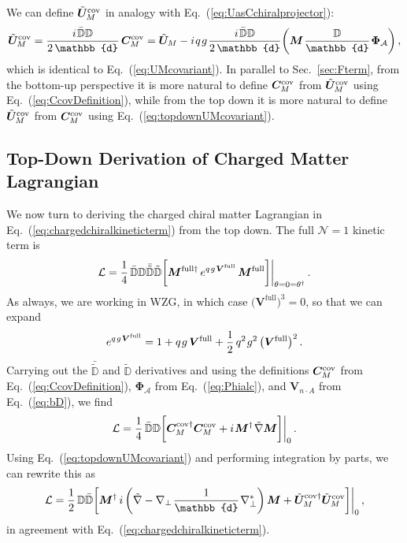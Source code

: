 \documentclass[12pt,document,nofootinbib,superscriptaddress,onecolumn,preprintnumbers,balancelastpage]{article}
\newcommand{\full}{\text{full}}
\newcommand{\s}{\hspace{0.8pt}}
\newcommand{\PP}{\mathbb{d}}
\DeclareRobustCommand{\Sec}[1]{Sec.~\ref{#1}}
\DeclareRobustCommand{\Eq}[1]{Eq.~(\ref{#1})}
\newcommand{\bM}{ \boldsymbol M}
\newcommand{\bPhiA}{ \boldsymbol{\Phi}_\alc}
\newcommand{\bC}{ \boldsymbol C}
\newcommand{\bV}{ \boldsymbol V}
\newcommand{\bD}{ \boldsymbol{V}_{n \cdot A}}
\newcommand{\bU}{ \tilde{\boldsymbol U}}
\newcommand{\D}{\mathbb{D}}
\newcommand{\alc}{\mathcal{A}}
\begin{document}
\begin{spacing}{1.2}
We can define $\bU_M^{\rm cov}$ in analogy with \Eq{eq:UasCchiralprojector}:
%
\begin{equation}
\label{eq:topdownUMcovariant}
\bU^{\rm cov}_M = \frac{i\s \bar{\D} \D}{2\,\PP}\, \bC^{\rm cov}_M = \bU_M - i\s q\s g\s \frac{i\s \bar{\D} \D}{2\, \PP} \bigg(\bM \s\frac{\D}{\PP} \s \bPhiA \bigg)\,,
\end{equation}
%
which is identical to \Eq{eq:UMcovariant}.
%
In parallel to \Sec{sec:Fterm}, from the bottom-up perspective it is more natural to define $\bC^{\rm cov}_M$ from $\bU^{\rm cov}_M$ using \Eq{eq:CcovDefinition}, while from the top down it is more natural to define $\bU^{\rm cov}_M$ from $\bC^{\rm cov}_M$ using \Eq{eq:topdownUMcovariant}. 



\subsection{Top-Down Derivation of Charged Matter Lagrangian}
\label{subsec:topdownchargedkinetic}
%
We now turn to deriving the charged chiral matter Lagrangian in \Eq{eq:chargedchiralkineticterm} from the top down.
%
The full $\mathcal{N} = 1$ kinetic term is
\begin{equation}
\mathcal{L} = \frac{1}{4}\, \bar{\D} \D \bar{\tilde{\D}} \tilde{\D} \bigg[ \bM^{\full \dagger}\, e^{q\s g\s \bV^\full}\, \bM^\full \bigg] \bigg|_{\theta = 0 = \theta^\dagger}\,.
\end{equation}
%
As always, we are working in WZG, in which case $\big(\bV^\full\big)^3 = 0$, so that we can expand 
\begin{align}
e^{q\s g\s \bV^\full} = 1 + q\s g\, \bV^\full + \frac{1}{2}\,q^2\s g^2\, \big(\bV^\full\big)^2\,.
\end{align}
%
Carrying out the $\bar{\tilde{\D}}$ and $\tilde{\D}$ derivatives and using the definitions $\bC^{\rm cov}_M$ from \Eq{eq:CcovDefinition}, $\bPhiA$ from \Eq{eq:Phialc}, and $\bD$ from \Eq{eq:bD}, we find
%
\begin{equation}
\mathcal{L} = \frac{1}{4}\, \bar{\D} \D \bigg[ \bC_M^{\rm cov \dagger} \bC^{\rm cov}_M + i\s \bM^\dagger\s \tilde{\nabla} \bM \bigg] \bigg|_{0}\,.
\end{equation}
%
Using \Eq{eq:topdownUMcovariant} and performing integration by parts, we can rewrite this as
%
\begin{equation}
\mathcal{L} = \frac{1}{2}\, \D \bar{\D} \bigg[ \bM^\dagger\, i \left(\tilde{\nabla} - \nabla_\perp\s \frac{1}{\PP}\s \nabla_\perp^* \right)  \bM + \bU_M^{\rm cov \dagger} \bU_M^{\rm cov} \bigg] \bigg|_{0} \,,
\end{equation}
%
in agreement with \Eq{eq:chargedchiralkineticterm}. 



\end{spacing}
\end{document}
